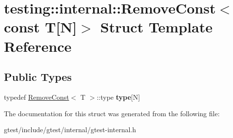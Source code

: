 \hypertarget{structtesting_1_1internal_1_1RemoveConst_3_01const_01T[N]_4}{}\section{testing\+:\+:internal\+:\+:Remove\+Const$<$ const T\mbox{[}N\mbox{]}$>$ Struct Template Reference}
\label{structtesting_1_1internal_1_1RemoveConst_3_01const_01T[N]_4}
\subsection*{Public Types}
\begin{DoxyCompactItemize}
\item 
\mbox{\label{structtesting_1_1internal_1_1RemoveConst_3_01const_01T[N]_4_ac976b53cb5d031a120fafbe790650068}} 
typedef \hyperlink{structtesting_1_1internal_1_1RemoveConst}{Remove\+Const}$<$ T $>$\+::type {\bfseries type}\mbox{[}N\mbox{]}
\end{DoxyCompactItemize}


The documentation for this struct was generated from the following file\+:\begin{DoxyCompactItemize}
\item 
gtest/include/gtest/internal/gtest-\/internal.\+h\end{DoxyCompactItemize}
